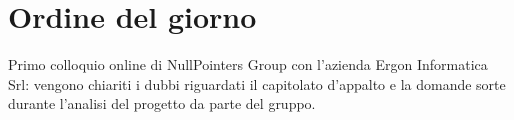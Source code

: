 \section{Ordine del giorno}

    Primo colloquio online di NullPointers Group con l'azienda Ergon Informatica Srl: vengono chiariti i dubbi riguardati il capitolato d'appalto e la domande sorte durante l'analisi del progetto da parte del gruppo.